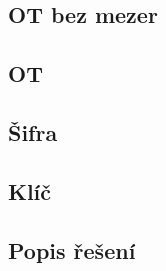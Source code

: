 \documentclass[12pt]{article} %
\begin{document}
\subsection{OT bez mezer}

\subsection{OT}

\subsection{Šifra}

\subsection{Klíč}

\subsection{Popis řešení}
\end{document}

